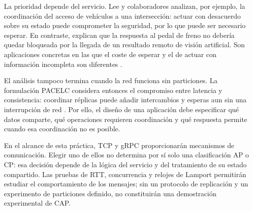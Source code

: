 La prioridad depende del servicio. Lee y colaboradores analizan, por ejemplo, la
coordinación del acceso de vehículos a una intersección: actuar con desacuerdo sobre
su estado puede comprometer la seguridad, por lo que puede ser necesario esperar.
En contraste, explican que la respuesta al pedal de freno no debería quedar bloqueada
por la llegada de un resultado remoto de visión artificial. Son aplicaciones
concretas en las que el coste de esperar y el de actuar con información incompleta
son diferentes \cite[pp.~138:2--138:3]{belinda_lee2023_cap}.

El análisis tampoco termina cuando la red funciona sin particiones. La formulación
PACELC considera entonces el compromiso entre latencia y consistencia: coordinar
réplicas puede añadir intercambios y esperas aun sin una interrupción de red
\cite[p.~172]{belinda_ahmed2023_consistency}.
Por ello, el diseño de una aplicación debe especificar qué datos comparte, qué
operaciones requieren coordinación y qué respuesta permite cuando esa coordinación
no es posible.

En el alcance de esta práctica, TCP y gRPC proporcionarán mecanismos de comunicación.
Elegir uno de ellos no determina por sí solo una clasificación AP o CP: esa decisión
depende de la lógica del servicio y del tratamiento de su estado compartido.
Las pruebas de RTT, concurrencia y relojes de Lamport permitirán estudiar el
comportamiento de los mensajes; sin un protocolo de replicación y un experimento
de particiones definido, no constituirán una demostración experimental de CAP.
